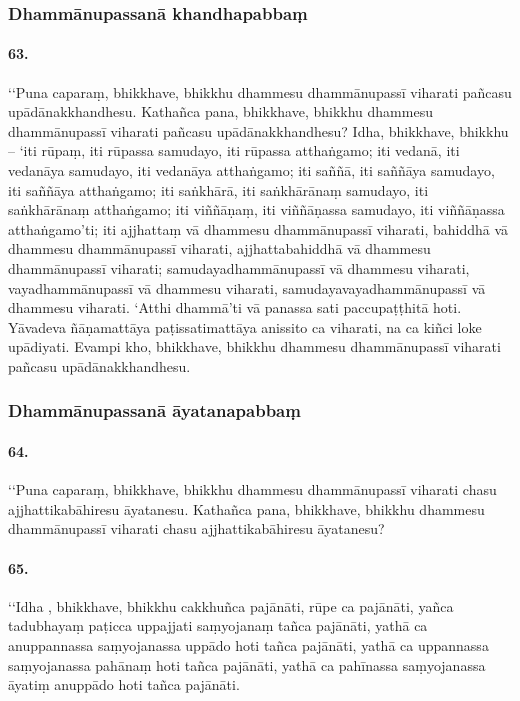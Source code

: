 
\subsubsection{Dhammānupassanā khandhapabbaṃ}

\paragraph{63.} ‘‘Puna caparaṃ, bhikkhave, bhikkhu dhammesu dhammānupassī viharati pañcasu upādānakkhandhesu. Kathañca pana, bhikkhave, bhikkhu dhammesu dhammānupassī viharati pañcasu upādānakkhandhesu? Idha, bhikkhave, bhikkhu – ‘iti rūpaṃ, iti rūpassa samudayo, iti rūpassa atthaṅgamo; iti vedanā, iti vedanāya samudayo, iti vedanāya atthaṅgamo; iti saññā, iti saññāya samudayo, iti saññāya atthaṅgamo; iti saṅkhārā, iti saṅkhārānaṃ samudayo, iti saṅkhārānaṃ atthaṅgamo; iti viññāṇaṃ, iti viññāṇassa samudayo, iti viññāṇassa atthaṅgamo’ti; iti ajjhattaṃ vā dhammesu dhammānupassī viharati, bahiddhā vā dhammesu dhammānupassī viharati, ajjhattabahiddhā vā dhammesu dhammānupassī viharati; samudayadhammānupassī vā dhammesu viharati, vayadhammānupassī vā dhammesu viharati, samudayavayadhammānupassī vā dhammesu viharati. ‘Atthi dhammā’ti vā panassa sati paccupaṭṭhitā hoti. Yāvadeva ñāṇamattāya paṭissatimattāya anissito ca viharati, na ca kiñci loke upādiyati. Evampi kho, bhikkhave, bhikkhu dhammesu dhammānupassī viharati pañcasu upādānakkhandhesu.


\subsubsection{Dhammānupassanā āyatanapabbaṃ}

\paragraph{64.} ‘‘Puna caparaṃ, bhikkhave, bhikkhu dhammesu dhammānupassī viharati chasu ajjhattikabāhiresu āyatanesu. Kathañca pana, bhikkhave, bhikkhu dhammesu dhammānupassī viharati chasu ajjhattikabāhiresu āyatanesu?

\paragraph{65.} ‘‘Idha , bhikkhave, bhikkhu cakkhuñca pajānāti, rūpe ca pajānāti, yañca tadubhayaṃ paṭicca uppajjati saṃyojanaṃ tañca pajānāti, yathā ca anuppannassa saṃyojanassa uppādo hoti tañca pajānāti, yathā ca uppannassa saṃyojanassa pahānaṃ hoti tañca pajānāti, yathā ca pahīnassa saṃyojanassa āyatiṃ anuppādo hoti tañca pajānāti.

